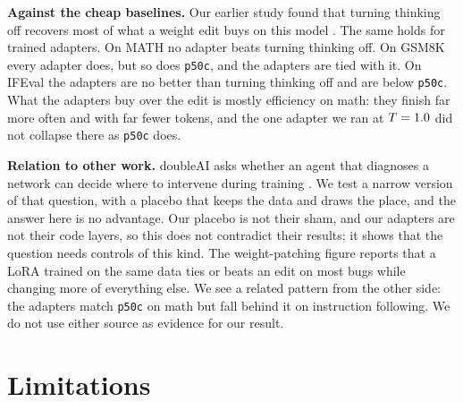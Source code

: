 \documentclass[11pt]{article}
\begin{document}
\textbf{Against the cheap baselines.} Our earlier study found that turning thinking off recovers most of what a weight edit buys on this model \citep{giraldo2026}. The same holds for trained adapters. On MATH no adapter beats turning thinking off. On GSM8K every adapter does, but so does \texttt{p50c}, and the adapters are tied with it. On IFEval the adapters are no better than turning thinking off and are below \texttt{p50c}. What the adapters buy over the edit is mostly efficiency on math: they finish far more often and with far fewer tokens, and the one adapter we ran at $T=1.0$ did not collapse there as \texttt{p50c} does.

\textbf{Relation to other work.} doubleAI asks whether an agent that diagnoses a network can decide where to intervene during training \citep{doubleai2026}. We test a narrow version of that question, with a placebo that keeps the data and draws the place, and the answer here is no advantage. Our placebo is not their sham, and our adapters are not their code layers, so this does not contradict their results; it shows that the question needs controls of this kind. The weight-patching figure \citep{kevinpl07weightpatching} reports that a LoRA trained on the same data ties or beats an edit on most bugs while changing more of everything else. We see a related pattern from the other side: the adapters match \texttt{p50c} on math but fall behind it on instruction following. We do not use either source as evidence for our result.

\section{Limitations}\label{sec:6}
\end{document}
